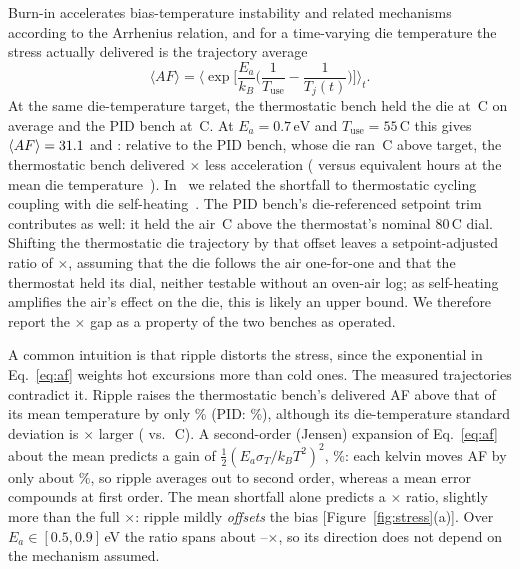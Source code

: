 \documentclass[10pt,twocolumn]{article}
\newcommand{\degC}{\,\textdegree C}
\newcommand{\unit}[1]{\,\mathrm{#1}}
\begin{document}
Burn-in accelerates bias-temperature instability and related mechanisms according to the Arrhenius relation, and for a time-varying die temperature the stress actually delivered is the trajectory average
\begin{equation}
\langle AF\rangle=\Big\langle \exp\!\Big[\frac{E_a}{k_B}\Big(\frac{1}{T_{\mathrm{use}}}-\frac{1}{T_j(t)}\Big)\Big]\Big\rangle_t .
\label{eq:af}
\end{equation}
At the same die-temperature target, the thermostatic bench held the die at \vTBB\degC{} on average and the PID bench at \vTPID\degC. At $E_a=0.7\unit{eV}$ and $T_{\mathrm{use}}=55$\degC{} this gives $\langle AF\rangle=31.1$ and \vAFPID: relative to the PID bench, whose die ran \vTerrPID\degC{} above target, the thermostatic bench delivered \vAFratio$\times$ less acceleration (\vEqhBB{} versus \vEqhPID{} equivalent hours at the mean die temperature~\cite{sbcci26}). In~\cite{sbcci26} we related the shortfall to thermostatic cycling coupling with die self-heating~\cite{semenov}. The PID bench's die-referenced setpoint trim contributes as well: it held the air \vSPoffset\degC{} above the thermostat's nominal 80\degC{} dial. Shifting the thermostatic die trajectory by that offset leaves a setpoint-adjusted ratio of \vAFratioSPadj$\times$, assuming that the die follows the air one-for-one and that the thermostat held its dial, neither testable without an oven-air log; as self-heating amplifies the air's effect on the die, this is likely an upper bound. We therefore report the \vAFratio$\times$ gap as a property of the two benches as operated.

A common intuition is that ripple distorts the stress, since the exponential in Eq.~\eqref{eq:af} weights hot excursions more than cold ones. The measured trajectories contradict it. Ripple raises the thermostatic bench's delivered AF above that of its mean temperature by only \vRippleBB\% (PID: \vRipplePID\%), although its die-temperature standard deviation is \vTsdRatio$\times$ larger (\vTsdBB{} vs.\ \vTsdPID\degC). A second-order (Jensen) expansion of Eq.~\eqref{eq:af} about the mean predicts a gain of $\tfrac{1}{2}(E_a\sigma_T/k_BT^2)^2$, \vJensen\%: each kelvin moves AF by only about \vAFperK\%, so ripple averages out to second order, whereas a mean error compounds at first order. The mean shortfall alone predicts a \vAFratioMeanOnly$\times$ ratio, slightly more than the full \vAFratio$\times$: ripple mildly \emph{offsets} the bias [Figure~\ref{fig:stress}(a)]. Over $E_a\in[0.5,0.9]$\,eV the ratio spans about \vAFratioLoOne--\vAFratioHiOne$\times$, so its direction does not depend on the mechanism assumed.
\end{document}
